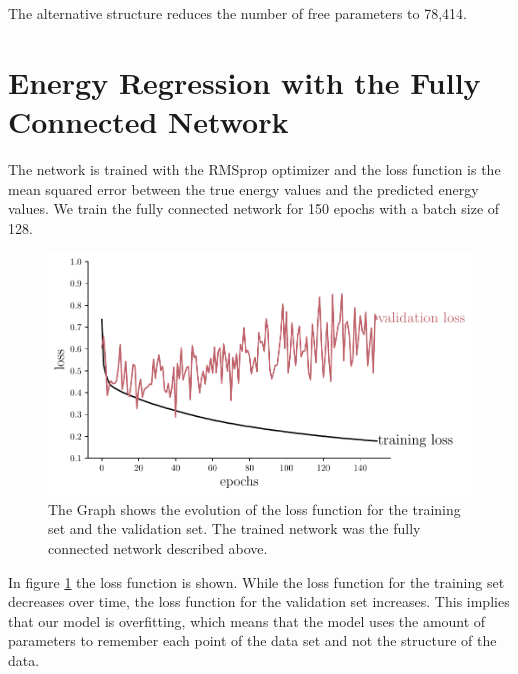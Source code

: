 \documentclass[12pt, a4paper]{thesis}
\begin{document}
The alternative structure reduces the number of free parameters to 78,414.

\section{Energy Regression with the Fully Connected Network}
\label{sec:orgdf3234b}

The network is trained with the RMSprop optimizer and the loss
function is the mean squared error between the true energy values and
the predicted energy values. We train the fully connected network for
150 epochs with a batch size of 128.

\begin{figure}[H]
  \centering
  \includegraphics[width=.9\linewidth]{../images/dense_loss.pdf}
  \caption{The Graph shows the evolution of the loss function for the
    training set and the validation set. The trained network was the
    fully connected network described above.}
  \label{dense_loss}
\end{figure}


In figure \ref{dense_loss} the loss function is shown. While the loss
function for the training set decreases over time, the loss function
for the validation set increases. This implies that our model is
overfitting, which means that the model uses the amount of parameters
to remember each point of the data set and not the structure of the
data.
\end{document}
